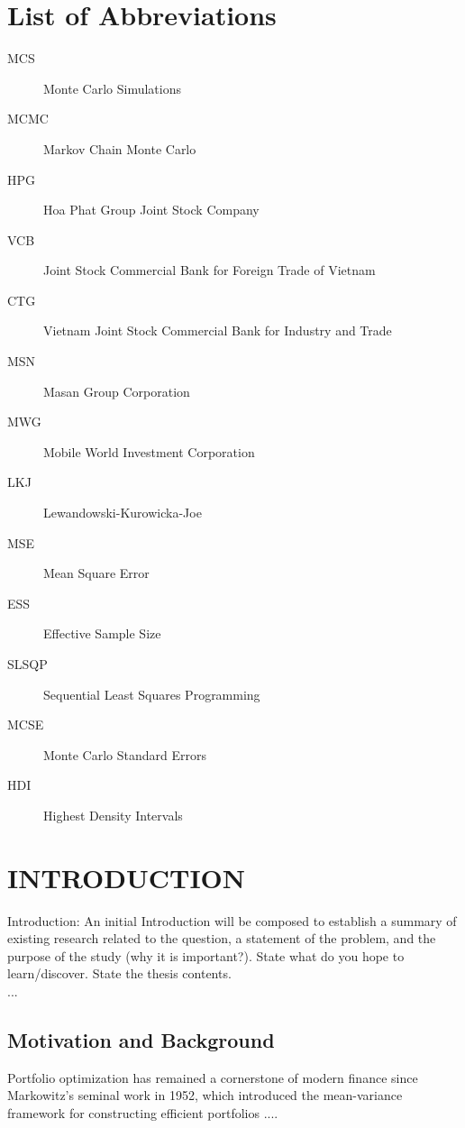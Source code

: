 \documentclass[12pt,a4paper,oneside]{book}
\theoremstyle{definition}
\begin{document}
\chapter*{List of Abbreviations}
\begin{description}
    \item[MCS] Monte Carlo Simulations 
    \item[MCMC] Markov Chain Monte Carlo
    \item[HPG] Hoa Phat Group Joint Stock Company
    \item[VCB] Joint Stock Commercial Bank for Foreign Trade of Vietnam
    \item[CTG] Vietnam Joint Stock Commercial Bank for Industry and Trade
    \item[MSN] Masan Group Corporation
    \item[MWG] Mobile World Investment Corporation
    \item[LKJ] Lewandowski-Kurowicka-Joe
    \item[MSE] Mean Square Error
    \item[ESS] Effective Sample Size
    \item[SLSQP] Sequential Least Squares Programming
    \item[MCSE]  Monte Carlo Standard Errors
    \item[HDI] Highest Density Intervals
\end{description}

\clearpage
\newpage 
\clearpage

\chapter{INTRODUCTION}


 {\color{red}Introduction:} An initial Introduction will be composed to establish a summary of existing research related to the question, a statement of the problem, and the purpose of the study (why it is important?). State what do you hope to learn/discover. {\color{red}State the thesis contents.}\\

...
\section{Motivation and Background}


 
Portfolio optimization has remained a cornerstone of modern finance since Markowitz's seminal work in 1952, which introduced the mean-variance framework for constructing efficient portfolios \cite{markowitz1952} ....
\end{document}
